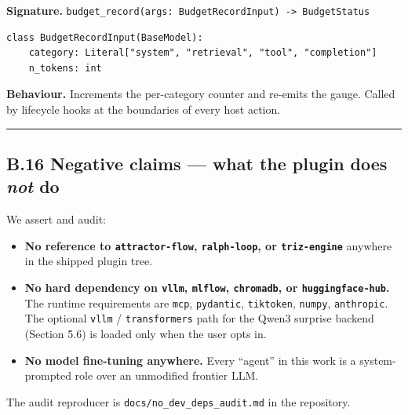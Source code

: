 \textbf{Signature.} \texttt{budget\_record(args:\ BudgetRecordInput)\ -\textgreater{}\ BudgetStatus}

\begin{verbatim}
class BudgetRecordInput(BaseModel):
    category: Literal["system", "retrieval", "tool", "completion"]
    n_tokens: int
\end{verbatim}

\textbf{Behaviour.} Increments the per-category counter and re-emits the gauge. Called by lifecycle hooks at the boundaries of every host action.

\begin{center}\rule{0.5\linewidth}{0.5pt}\end{center}

\subsection{\texorpdfstring{B.16 Negative claims --- what the plugin does \emph{not} do}{B.16 Negative claims --- what the plugin does not do}}\label{b.16-negative-claims-what-the-plugin-does-not-do}

We assert and audit:

\begin{itemize}
\tightlist
\item
  \textbf{No reference to \texttt{attractor-flow}, \texttt{ralph-loop}, or \texttt{triz-engine}} anywhere in the shipped plugin tree.
\item
  \textbf{No hard dependency on \texttt{vllm}, \texttt{mlflow}, \texttt{chromadb}, or \texttt{huggingface-hub}.} The runtime requirements are \texttt{mcp}, \texttt{pydantic}, \texttt{tiktoken}, \texttt{numpy}, \texttt{anthropic}. The optional \texttt{vllm} / \texttt{transformers} path for the Qwen3 surprise backend (Section 5.6) is loaded only when the user opts in.
\item
  \textbf{No model fine-tuning anywhere.} Every ``agent'' in this work is a system-prompted role over an unmodified frontier LLM.
\end{itemize}

The audit reproducer is \texttt{docs/no\_dev\_deps\_audit.md} in the repository.
